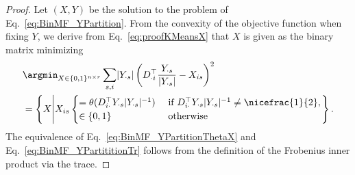 \BMFpartition*
\begin{proof}
Let $(X,Y)$ be the solution to the problem of Eq.~\eqref{eq:BinMF_YPartition}. From the convexity of the objective function when fixing $Y$, we derive from Eq.~\eqref{eq:proofKMeansX} that $X$ is given as the binary matrix minimizing
\begin{align*}
&\argmin_{X\in \{0,1\}^{n\times r}}\sum_{s,i}\lvert Y_{\cdot s}\rvert \left(D_{\cdot i}^\top \frac{Y_{\cdot s}}{\lvert Y_{\cdot s}\rvert }-X_{is}\right)^2\\ 
&= \left\{X\middle\vert X_{is} 
\begin{cases}
= \theta(D_{i\cdot}^\top Y_{\cdot s}\lvert Y_{\cdot s}\rvert ^{-1}) &\text{ if } D_{i\cdot}^\top Y_{\cdot s}\lvert Y_{\cdot s}\rvert ^{-1}\neq \nicefrac{1}{2},\\ 
\in\{0,1\} &\text{ otherwise} 
\end{cases}\right\}.
\end{align*}
The equivalence of Eq.~\eqref{eq:BinMF_YPartitionThetaX} and Eq.~\eqref{eq:BinMF_YPartititionTr} follows from the definition of the Frobenius inner product via the trace.
\end{proof}
